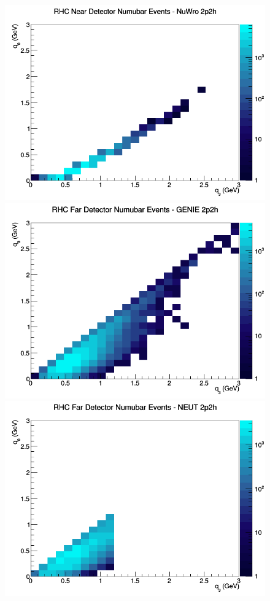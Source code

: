 \documentclass[12pt]{article}
\begin{document}
\begin{figure}[h]
\includegraphics[width=\linewidth]{q0_q3/nominal/2p2h_RHC_ND_numubar_q3_q0_NuWro.png}
\endminipage
\newline
{}
\includegraphics[width=\linewidth]{q0_q3/nominal/2p2h_RHC_FD_numubar_q3_q0_GENIE.png}
\endminipage
{}
\includegraphics[width=\linewidth]{q0_q3/nominal/2p2h_RHC_FD_numubar_q3_q0_NEUT.png}

\end{figure}
\end{document}
